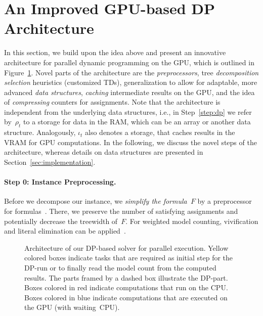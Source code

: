 \documentclass{llncs}
\begin{document}
\section{An Improved GPU-based DP Architecture}
%
In this section, we build upon the idea above and
present an innovative architecture for parallel
dynamic programming on the GPU, which is outlined in Figure~\ref{fig:gpudp}.
%
%
%
Novel parts of the architecture are the
\emph{preprocessors}, tree \emph{decomposition selection} heuristics
(customized TDs), generalization to allow for adaptable, more advanced
\emph{data structures}, \emph{caching} intermediate results on the
GPU, and the idea of \emph{compressing} counters for assignments.
%
%
%
%
Note that the architecture is independent from the underlying data
structures, i.e., in Step~\ref{step:dp} we refer by~$\rho_t$ to a
storage for data in the RAM, which can be an array or another data structure.
Analogously, $\iota_t$ also denotes a storage, that caches results in
the VRAM for GPU computations.  In the following, we discuss the novel
steps of the architecture, whereas details on data structures are
presented in Section~\ref{sec:implementation}.
%
%

\paragraph*{Step 0: Instance Preprocessing.}
Before we decompose our instance, we \emph{simplify the formula~$F$}
by a preprocessor for 
formulas~\cite{LagniezLoncaMarquis16a,LagniezMarquis14a}. There, we
preserve the number of satisfying assignments and potentially decrease
the treewidth of~$F$. For weighted model counting,
vivification and literal elimination can be
applied~\cite{LagniezMarquis14a}.

\begin{figure}[t]
\centering
\caption{%
  Architecture of our DP-based solver for parallel execution. Yellow
  colored boxes indicate tasks that are required as initial step for
  the DP-run or to finally read the model count from the computed
  results.  The parts framed by a dashed box illustrate the DP-part.
  Boxes colored in red indicate computations that run on the
  CPU. Boxes colored in blue indicate computations that are executed
  on the GPU (with waiting~CPU).}
\label{fig:gpudp}
\end{figure}
\end{document}
